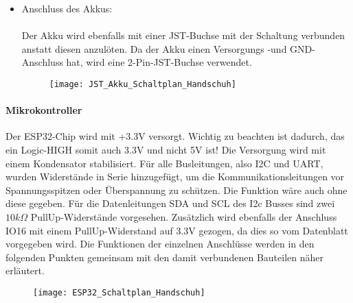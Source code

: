 \documentclass[titlepage,12pt,twoside]{article}
\begin{document}
\begin{itemize}
	\item Anschluss des Akkus: \\
		  \\
		  Der Akku wird ebenfalls mit einer JST-Buchse mit der Schaltung verbunden anstatt diesen anzulöten. Da der Akku einen
		  Versorgungs -und GND-Anschluss hat, wird eine 2-Pin-JST-Buchse verwendet. \\
		  \begin{figure}[H]
			\begin{center}
				\scalebox{0.5}
				{\texttt{[image: JST\_Akku\_Schaltplan\_Handschuh]}}
			\end{center}
		\end{figure}\end{itemize}

\paragraph{Mikrokontroller} 
\hfill \break
\hfill \break
Der ESP32-Chip wird mit +3.3V versorgt. Wichtig zu beachten ist dadurch, das ein Logic-HIGH somit auch 3.3V und nicht 5V ist!
Die Versorgung wird mit einem Kondensator stabilisiert. Für alle Busleitungen, also I2C und UART, wurden Widerstände in Serie
hinzugefügt, um die Kommunikationsleitungen vor Spannungsspitzen oder Überspannung zu schützen. Die Funktion wäre auch ohne diese
gegeben. Für die Datenleitungen SDA und SCL des I2c Busses sind zwei $10k\Omega$ PullUp-Widerstände vorgesehen. Zusätzlich 
wird ebenfalls der Anschluss IO16 mit einem PullUp-Widerstand auf 3.3V gezogen, da dies so vom Datenblatt vorgegeben wird. 
Die Funktionen der einzelnen Anschlüsse werden in den folgenden Punkten gemeinsam mit den damit verbundenen Bauteilen näher erläutert. \\
\begin{figure}[H]
	\begin{center}
		\scalebox{0.5}
		{\texttt{[image: ESP32\_Schaltplan\_Handschuh]}}
	\end{center}
\end{figure}
\end{document}
